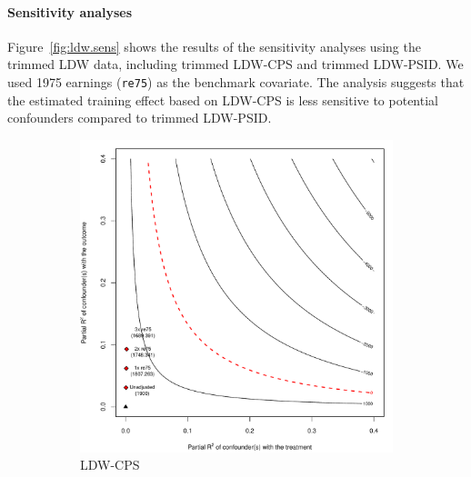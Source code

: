 \documentclass[letterpaper,12pt,leqno]{article}
\begin{document}
\paragraph{Sensitivity analyses} Figure~\ref{fig:ldw.sens} shows the results of the sensitivity analyses using the trimmed LDW data, including trimmed LDW-CPS and trimmed LDW-PSID. We used 1975 earnings (\texttt{re75}) as the benchmark covariate. The analysis suggests that the estimated training effect based on LDW-CPS is less sensitive to potential confounders compared to trimmed LDW-PSID. 

\begin{figure}[!ht]
    \caption{Sensitivity Analyses for Trimmed LDW-CPS and LDW-PSID}\label{fig:ldw.sens}
    \begin{minipage}[c]{1\textwidth}
        \centering
        \begin{subfigure}{0.45\linewidth}
            \includegraphics[width=\linewidth]{sens_ldw_cps.pdf}
            \caption{LDW-CPS}
        \end{subfigure}\hspace{1em}
        \begin{subfigure}{0.45\linewidth}

\end{subfigure}
\end{minipage}
\end{figure}
\end{document}
